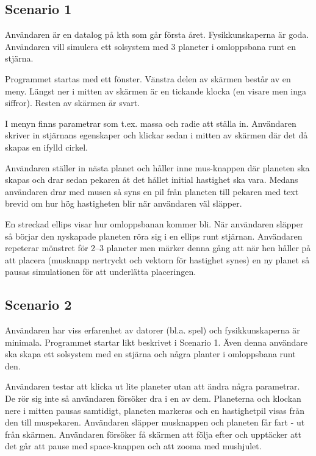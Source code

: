 
\subsection{Scenario 1}

Användaren är en datalog på kth som går första året.
Fysikkunskaperna är goda.
Användaren vill simulera ett solsystem med 3 planeter
i omloppsbana runt en stjärna.

Programmet startas med ett fönster.
Vänstra delen av skärmen består av en meny.
Längst ner i mitten av skärmen är en tickande
klocka (en visare men inga siffror).
Resten av skärmen är svart.

I menyn finns parametrar som t.ex. massa och radie att ställa in.
Användaren skriver in stjärnans egenskaper och klickar
sedan i mitten av skärmen där det då skapas en ifylld cirkel.

Användaren ställer in nästa planet och håller inne mus-knappen där
planeten ska skapas och drar sedan pekaren åt det hållet initial
hastighet ska vara.
Medans användaren drar med musen så syns en pil från planeten till
pekaren med text brevid om hur hög hastigheten blir när användaren väl släpper.

En streckad ellips visar hur omloppsbanan kommer bli.
När användaren släpper så börjar den nyskapade planeten röra sig
i en ellips runt stjärnan.
Användaren repeterar mönstret för 2--3 planeter men märker denna gång
att när hen håller på att placera (musknapp nertryckt och vektorn
för hastighet synes) en ny planet så pausas simulationen för att
underlätta placeringen.

\subsection{Scenario 2}

Användaren har viss erfarenhet av datorer (bl.a. spel) och
fysikkunskaperna är minimala.
Programmet startar likt beskrivet i Scenario 1.
Även denna användare ska skapa ett solsystem med en stjärna
och några planter i omloppsbana runt den.

Användaren testar att klicka ut lite planeter utan att ändra några parametrar.
De rör sig inte så användaren försöker dra i en av dem.
Planeterna och klockan nere i mitten pausas samtidigt,
planeten markeras och
en hastighetpil visas från den till muspekaren.
Användaren släpper musknappen och planeten får fart - ut från skärmen.
Användaren försöker få skärmen att följa efter och
upptäcker att det går att pause med space-knappen och
att zooma med mushjulet.

